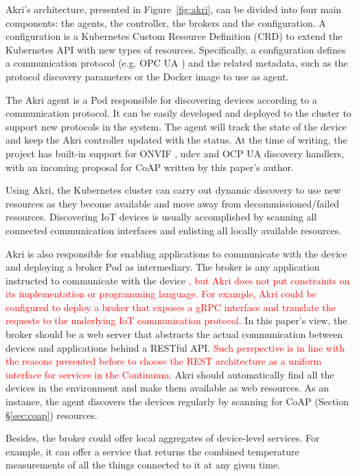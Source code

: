 {\color{red}
Akri's architecture, presented in Figure~\ref{fig:akri}, can be divided into four main components: the agents, the controller, the brokers and the configuration. A configuration is a Kubernetes Custom Resource Definition (CRD) to extend the Kubernetes API with new types of resources. Specifically, a configuration defines a communication protocol (e.g. OPC UA \cite{gruner2016restful}) and the related metadata, such as the protocol discovery parameters or the Docker image to use as agent.

The Akri agent is a Pod responsible for discovering devices according to a communication protocol. It can be easily developed and deployed to the cluster to support new protocols in the system. The agent will track the state of the device and keep the Akri controller updated with the status. At the time of writing, the project has built-in support for ONVIF \cite{onvif}, udev \cite{udev} and OCP UA \cite{gruner2016restful} discovery handlers, with an incoming proposal for CoAP \cite{bormann2012coap} written by this paper's author.}

Using Akri, the Kubernetes cluster can carry out dynamic discovery to use new resources as they become available and move away from decommissioned/failed resources. Discovering IoT devices is usually accomplished by scanning all connected communication interfaces and enlisting all locally available resources.

Akri is also responsible for enabling applications to communicate with the device and deploying a broker Pod as intermediary. The broker is any application instructed to communicate with the device \textcolor{red}{, but Akri does not put constraints on its implementation or programming language. For example, Akri could be configured to deploy a broker that exposes a gRPC \cite{gRPC} interface and translate the requests to the underlying IoT communication protocol.} In this paper's view, the broker should be a web server that abstracts the actual communication between devices and applications behind a RESTful API. \textcolor{red}{Such perspective is in line with the reasons presented before to choose the REST architecture as a uniform interface for services in the Continuum.} Akri should automatically find all the devices in the environment and make them available as web resources. As an instance, the agent discovers the devices regularly by scanning for CoAP (Section §\ref{sec:coap}) resources.

Besides, the broker could offer local aggregates of device-level services. For example, it can offer a service that returns the combined temperature measurements of all the things connected to it at any given time.

